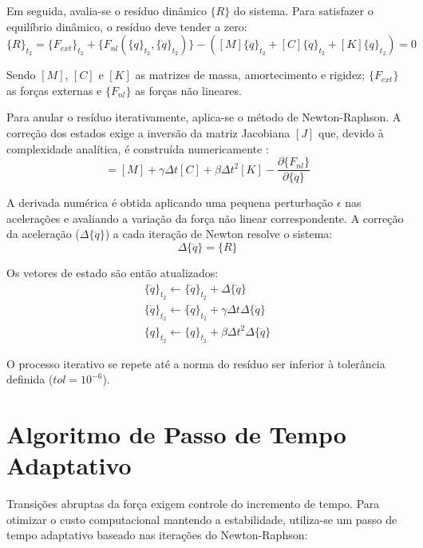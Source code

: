 Em seguida, avalia-se o resíduo dinâmico $\{R\}$ do sistema. Para satisfazer o equilíbrio dinâmico, o resíduo deve tender a zero:
\begin{equation}
	\{R\}_{t_2} = \{F_{ext}\}_{t_2} + \{F_{nl}(\{q\}_{t_2}, \{\dot{q}\}_{t_2})\} - \left( [M]\{\ddot{q}\}_{t_2} + [C]\{\dot{q}\}_{t_2} + [K]\{q\}_{t_2} \right) = 0
\end{equation}

Sendo $[M]$, $[C]$ e $[K]$ as matrizes de massa, amortecimento e rigidez; $\{F_{ext}\}$ as forças externas e $\{F_{nl}\}$ as forças não lineares. 

Para anular o resíduo iterativamente, aplica-se o método de Newton-Raphson. A correção dos estados exige a inversão da matriz Jacobiana $[J]$ que, devido à complexidade analítica, é construída numericamente \cite{jacobiano}:
\begin{equation}
	[J] = [M] + \gamma \Delta t [C] + \beta \Delta t^2 [K] - \frac{\partial \{F_{nl}\}}{\partial \{\ddot{q}\}}
\end{equation}

A derivada numérica é obtida aplicando uma pequena perturbação $\epsilon$ nas acelerações e avaliando a variação da força não linear correspondente. A correção da aceleração ($\Delta \{\ddot{q}\}$) a cada iteração de Newton resolve o sistema:
\begin{equation}
	[J] \Delta \{\ddot{q}\} = \{R\}
\end{equation}

Os vetores de estado são então atualizados:
\begin{gather}
	\{\ddot{q}\}_{t_2} \leftarrow \{\ddot{q}\}_{t_2} + \Delta \{\ddot{q}\}
\\
	\{\dot{q}\}_{t_2} \leftarrow \{\dot{q}\}_{t_2} + \gamma \Delta t \Delta \{\ddot{q}\}
\\
	\{q\}_{t_2} \leftarrow \{q\}_{t_2} + \beta \Delta t^2 \Delta \{\ddot{q}\}
\end{gather}

O processo iterativo se repete até a norma do resíduo ser inferior à tolerância definida ($tol = 10^{-6}$).

\section{Algoritmo de Passo de Tempo Adaptativo}

Transições abruptas da força exigem controle do incremento de tempo. Para otimizar o custo computacional mantendo a estabilidade, utiliza-se um passo de tempo adaptativo baseado nas iterações do Newton-Raphson:

